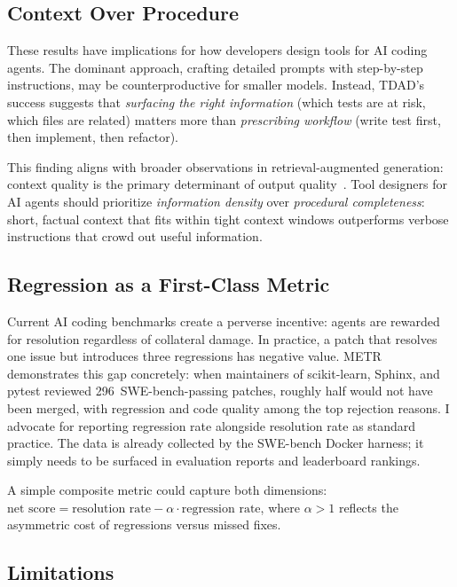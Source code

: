 \documentclass[sigconf,nonacm]{acmart}
\begin{document}
\subsection{Context Over Procedure}

These results have implications for how developers design tools for AI coding
agents.  The dominant approach, crafting detailed prompts with step-by-step
instructions, may be counterproductive for smaller models.  Instead,
\textsc{TDAD}'s success suggests that \emph{surfacing the right information}
(which tests are at risk, which files are related) matters more than
\emph{prescribing workflow} (write test first, then implement, then refactor).

This finding aligns with broader observations in
retrieval-augmented generation: context quality is the primary
determinant of output quality~\cite{edge2024graphrag}.  Tool designers
for AI agents should prioritize \emph{information density} over
\emph{procedural completeness}: short, factual context that fits within
tight context windows outperforms verbose instructions that crowd out
useful information.

\subsection{Regression as a First-Class Metric}

Current AI coding benchmarks create a perverse incentive: agents are rewarded
for resolution regardless of collateral damage.  In practice, a patch that
resolves one issue but introduces three regressions has negative value.
METR~\cite{metr2026swebench} demonstrates this gap concretely: when
maintainers of scikit-learn, Sphinx, and pytest reviewed 296~SWE-bench-passing
patches, roughly half would not have been merged, with regression and
code quality among the top rejection reasons.  I advocate for reporting
regression rate alongside resolution rate as standard practice.  The data is
already collected by the SWE-bench Docker harness; it simply needs to be
surfaced in evaluation reports and leaderboard rankings.

A simple composite metric could capture both dimensions:
$\text{net score} = \text{resolution rate} - \alpha \cdot
\text{regression rate}$, where $\alpha > 1$ reflects the asymmetric
cost of regressions versus missed fixes.

\subsection{Limitations}
\end{document}
